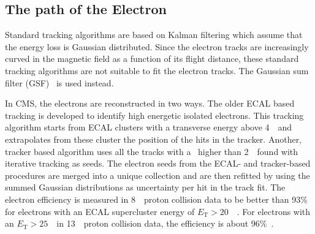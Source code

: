 %


\subsection{The path of the Electron}
\label{sec:ElectronTrack}
 Standard tracking algorithms are based on Kalman filtering which assume that the energy loss is Gaussian distributed. Since the  electron tracks are increasingly curved in the magnetic field as a function of its flight distance, these standard tracking algorithms are not suitable to fit the electron tracks. The Gaussian sum filter (GSF)~\cite{0954-3899-31-9-N01} is used instead. 

In CMS, the electrons are reconstructed in two ways. The older ECAL based tracking is developed to identify high energetic isolated electrons. This tracking algorithm starts from ECAL clusters with a transverse energy above 4~\GeV\ and extrapolates from these cluster the position of the hits in the tracker. Another, tracker based algorithm uses all the tracks with a \pt\ higher than 2~\GeV\ found with iterative tracking as seeds. The electron seeds from the ECAL- and tracker-based procedures are merged into a unique collection and are then refitted  by using the summed Gaussian distributions as uncertainty per hit in the track fit. The electron efficiency is measured in 8~\TeV\ proton collision data to be better than 93\% for electrons with an ECAL supercluster energy of $E_{\mathrm{T}}>20$~\GeV~\cite{1748-0221-10-06-P06005}. For electrons with an  $E_{\mathrm{T}}>25$~\GeV\  in 13~\TeV\ proton collision data, the efficiency is about 96\%~\cite{CMS-DP-2017-004}.


